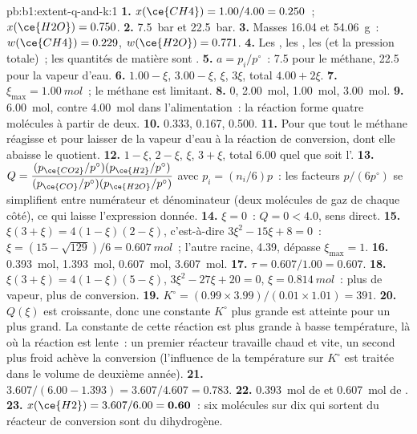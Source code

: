\begin{solution}{pb:b1:extent-q-and-k:1}
\textbf{1.} $x(\ce{CH4}) = 1.00/4.00 = 0.250$~; $x(\ce{H2O}) = 0.750$.
\textbf{2.} \qty{7.5}{bar} et \qty{22.5}{bar}.
\textbf{3.} Masses 16.04 et \qty{54.06}{g}~: $w(\ce{CH4}) = 0.229$,
$w(\ce{H2O}) = 0.771$.
\textbf{4.} Les , les , les
 (et la pression totale)~; les quantités de matière
sont .
\textbf{5.} $a = p_i/p^\circ$~: 7.5 pour le méthane, 22.5 pour la vapeur
d'eau.
\textbf{6.}  $1.00 - \xi$,  $3.00 - \xi$,  $\xi$,
 $3\xi$, total $4.00 + 2\xi$.
\textbf{7.} $\xi_{\max} = \qty{1.00}{mol}$~; le méthane est limitant.
\textbf{8.}  0,  \qty{2.00}{mol},  \qty{1.00}{mol},
 \qty{3.00}{mol}.
\textbf{9.} \qty{6.00}{mol}, contre \qty{4.00}{mol} dans l'alimentation~:
la réaction forme quatre molécules à partir de deux.
\textbf{10.}  0.333,  0.167,  0.500.
\textbf{11.} Pour que tout le méthane réagisse et pour laisser de la
vapeur d'eau à la réaction de conversion, dont elle abaisse le quotient.
\textbf{12.}  $1 - \xi$,  $2 - \xi$,  $\xi$, 
$3 + \xi$, total 6.00 quel que soit l'.
\textbf{13.} $Q = \dfrac{(p_{\ce{CO2}}/p^\circ)(p_{\ce{H2}}/p^\circ)}
{(p_{\ce{CO}}/p^\circ)(p_{\ce{H2O}}/p^\circ)}$ avec $p_i = (n_i/6)p$~:
les facteurs $p/(6p^\circ)$ se simplifient entre numérateur et
dénominateur (deux molécules de gaz de chaque côté), ce qui laisse
l'expression donnée.
\textbf{14.} $\xi = 0$~: $Q = 0 < 4.0$, sens direct.
\textbf{15.} $\xi(3 + \xi) = 4(1 - \xi)(2 - \xi)$, c'est-à-dire
$3\xi^2 - 15\xi +
8 = 0$~: $\xi = (15 - \sqrt{129})/6 = \qty{0.607}{mol}$~; l'autre
racine, 4.39, dépasse $\xi_{\max} = 1$.
\textbf{16.}  \qty{0.393}{mol},  \qty{1.393}{mol},
 \qty{0.607}{mol},  \qty{3.607}{mol}.
\textbf{17.} $\tau = 0.607/1.00 = 0.607$.
\textbf{18.} $\xi(3 + \xi) = 4(1 - \xi)(5 - \xi)$, $3\xi^2 - 27\xi + 20 =
0$, $\xi = \qty{0.814}{mol}$~: plus de vapeur, plus de conversion.
\textbf{19.} $K^\circ = (0.99 \times 3.99)/(0.01 \times 1.01) = 391$.
\textbf{20.} $Q(\xi)$ est croissante, donc une constante $K^\circ$ plus
grande est atteinte pour un  plus grand. La constante de cette
réaction est plus grande à basse température, là où la réaction est
lente~: un premier réacteur travaille chaud et vite, un second plus
froid achève la conversion (l'influence de la température sur $K^\circ$
est traitée dans le volume de deuxième année).
\textbf{21.} $3.607/(6.00 - 1.393) = 3.607/4.607 = 0.783$.
\textbf{22.} \qty{0.393}{mol} de  et \qty{0.607}{mol} de .
\textbf{23.} $x(\ce{H2}) = 3.607/6.00 = \textbf{0.60}$~: six molécules sur
dix qui sortent du réacteur de conversion sont du dihydrogène.
\end{solution}
